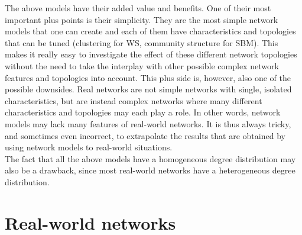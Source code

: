 \documentclass[11 pt , letterpaper , twoside , openright]{book}
\begin{document}
\newline
The above models have their added value and benefits. One of their most important plus points is their simplicity. They are the most simple network models that one can create and each of them have characteristics and topologies that can be tuned (clustering for WS, community structure for SBM). This makes it really easy to investigate the effect of these different network topologies without the need to take the interplay with other possible complex network features and topologies into account. This plus side is, however, also one of the possible downsides. Real networks are not simple networks with single, isolated characteristics, but are instead complex networks where many different characteristics and topologies may each play a role. In other words, network models may lack many features of real-world networks. It is thus always tricky, and sometimes even incorrect, to extrapolate the results that are obtained by using network models to real-world situations.\\
\newline
The fact that all the above models have a homogeneous degree distribution may also be a drawback, since most real-world networks have a heterogeneous degree distribution.

\section{Real-world networks}\label{realnetwork}
\end{document}
